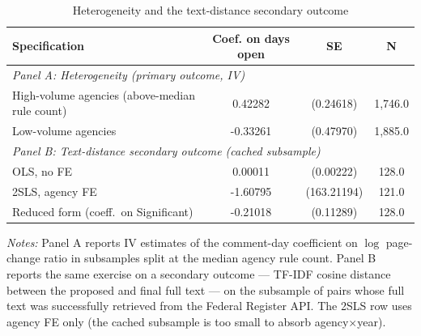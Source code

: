 \begin{table}[t]
\caption{Heterogeneity and the text-distance secondary outcome}
\label{tab:het}
\centering
\small
\begin{tabular}{lccc}
\toprule
Specification & Coef. on days open & SE & N \\
\midrule
\multicolumn{4}{l}{\textit{Panel A: Heterogeneity (primary outcome, IV)}} \\
High-volume agencies (above-median rule count) & 0.42282 & (0.24618) & 1,746.0 \\
Low-volume agencies                              & -0.33261 & (0.47970) & 1,885.0 \\
\midrule
\multicolumn{4}{l}{\textit{Panel B: Text-distance secondary outcome (cached subsample)}} \\
OLS, no FE                                       & 0.00011 & (0.00222) & 128.0 \\
2SLS, agency FE                                  & -1.60795 & (163.21194) & 121.0 \\
Reduced form (coeff.~on Significant)             & -0.21018 & (0.11289) & 128.0 \\
\bottomrule
\end{tabular}
\begin{flushleft}\footnotesize \textit{Notes:} Panel A reports IV estimates of the comment-day coefficient on $\log$ page-change ratio in subsamples split at the median agency rule count. Panel B reports the same exercise on a secondary outcome --- TF-IDF cosine distance between the proposed and final full text --- on the subsample of pairs whose full text was successfully retrieved from the Federal Register API. The 2SLS row uses agency FE only (the cached subsample is too small to absorb agency$\times$year). \end{flushleft}
\end{table}
